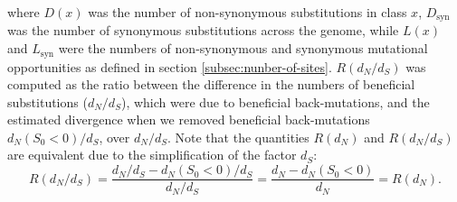 \documentclass{article}
\newcommand{\dn}{d_N}
\newcommand{\ds}{d_S}
\newcommand{\dnds}{\dn / \ds}
\newcommand{\Sphy}{S_{0}}
\newcommand{\Sphyclass}{x}
\begin{document}
    where $D \left( \Sphyclass \right) $ was the number of non-synonymous substitutions in class $\Sphyclass$, $D_{\text{syn}}$ was the number of synonymous substitutions across the genome, while $L \left( \Sphyclass \right)$ and $L_{\text{syn}}$ were the numbers of non-synonymous and synonymous mutational opportunities as defined in section \ref{subsec:nunber-of-sites}.
    $R(\dnds)$ was computed as the ratio between the difference in the numbers of beneficial substitutions ($\dnds$), which were due to beneficial back-mutations, and the estimated divergence when we removed beneficial back-mutations $\dn (\Sphy < 0) / \ds$, over $\dnds$.
    Note that the quantities $R(\dn)$ and $R(\dnds)$ are equivalent due to the simplification of the factor $\ds$:
    \begin{equation}
        R(\dnds) = \dfrac{\dnds - \dn(\Sphy < 0) / \ds}{\dnds} = \dfrac{\dn - \dn(\Sphy < 0)}{\dn} = R(\dn).
    \end{equation}
\end{document}
